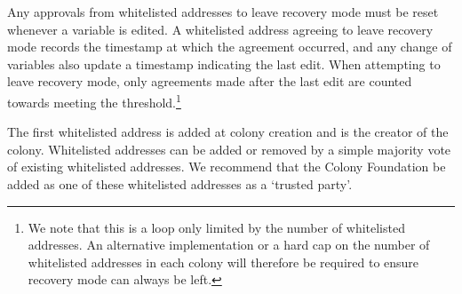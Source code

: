 Any approvals from whitelisted addresses to leave recovery mode must be reset whenever a variable is edited. A whitelisted address agreeing to leave recovery mode records the timestamp at which the agreement occurred, and any change of variables also update a timestamp indicating the last edit. When attempting to leave recovery mode, only agreements made after the last edit are counted towards meeting the threshold.\footnote{We note that this is a loop only limited by the number of whitelisted addresses. An alternative implementation or a hard cap on the number of whitelisted addresses in each colony will therefore be required to ensure recovery mode can always be left.}

The first whitelisted address is added at colony creation and is the creator of the colony. Whitelisted addresses can be added or removed by a simple majority vote of existing whitelisted addresses. We recommend that the Colony Foundation be added as one of these whitelisted addresses as a `trusted party'.